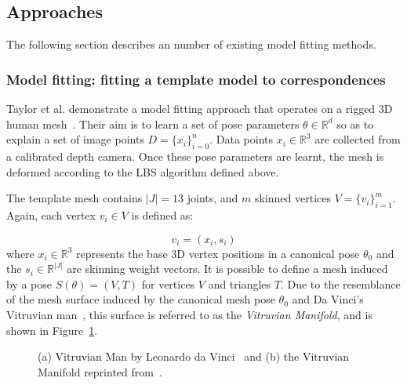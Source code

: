     \subsection{Approaches}
    The following section describes an number of existing model fitting methods.

    \subsubsection{Model fitting: fitting a template model to correspondences}


    Taylor et al. demonstrate a model fitting approach that operates on a rigged 3D human mesh~\cite{taylor2012vitruvian}. Their aim is to learn a set of pose parameters $\theta \in \mathbb{R}^{d}$ so as to explain a set of image points $D = \{x_{i}\}_{i=0}^{n}$. Data points $x_{i} \in \mathbb{R}^{3}$ are collected from a calibrated depth camera. Once these pose parameters are learnt, the mesh is deformed according to the LBS algorithm defined above.

    The template mesh contains $|J| = 13$ joints, and $m$ skinned vertices ${V} = \{v_{i}\}_{i=1}^{m}$. Again, each vertex $v_{i} \in V$ is defined as:

    \begin{equation}
        v_{i} = (x_{i}, s_{i})
    \end{equation}
    where $x_{i} \in \mathbb{R}^{3}$ represents the base 3D vertex positions in a canonical pose $\theta_{0}$ and the $s_{i} \in \mathbb{R}^{|J|}$ are skinning weight vectors. It is possible to define a mesh induced by a pose $S(\theta) = (V, T)$ for vertices $V$ and triangles $T$. Due to the resemblance of the mesh surface induced by the canonical mesh pose $\theta_{0}$ and Da Vinci's Vitruvian man~\cite{davinci}, this surface is referred to as the \emph{Vitruvian Manifold}, and is shown in Figure~\ref{fig:vitruvian_man}. 

    \begin{figure}[H] %
        \caption{(a) Vitruvian Man by Leonardo da Vinci~\cite{davinci} and (b) the Vitruvian Manifold reprinted from~\cite{taylor2012vitruvian}.}
        \label{fig:vitruvian_man}
    \end{figure}

